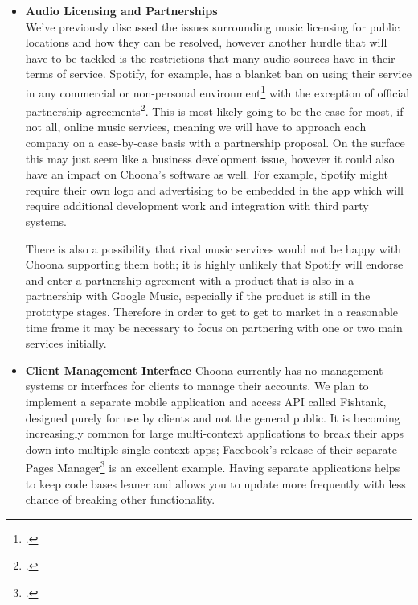 \begin{itemize}
  \item \textbf{Audio Licensing and Partnerships}\\
    We've previously discussed the issues surrounding music licensing for public locations and how they can be resolved, however another hurdle that will have to be tackled is the restrictions that many audio sources have in their terms of service. Spotify, for example, has a blanket ban on using their service in any commercial or non-personal environment\footcite{spotifypublic} with the exception of official partnership agreements\footcite{spotifypartners}. This is most likely going to be the case for most, if not all, online music services, meaning we will have to approach each company on a case-by-case basis with a partnership proposal. On the surface this may just seem like a business development issue, however it could also have an impact on Choona's software as well. For example, Spotify might require their own logo and advertising to be embedded in the app which will require additional development work and integration with third party systems.

    There is also a possibility that rival music services would not be happy with Choona supporting them both; it is highly unlikely that Spotify will endorse and enter a partnership agreement with a product that is also in a partnership with Google Music, especially if the product is still in the prototype stages. Therefore in order to get to get to market in a reasonable time frame it may be necessary to focus on partnering with one or two main services initially.

  \item \textbf{Client Management Interface}
    Choona currently has no management systems or interfaces for clients to manage their accounts. We plan to implement a separate mobile application and access API called Fishtank, designed purely for use by clients and not the general public. It is becoming increasingly common for large multi-context applications to break their apps down into multiple single-context apps; Facebook's release of their separate Pages Manager\footcite{facebookpages} is an excellent example. Having separate applications helps to keep code bases leaner and allows you to update more frequently with less chance of breaking other functionality.


\end{itemize}
